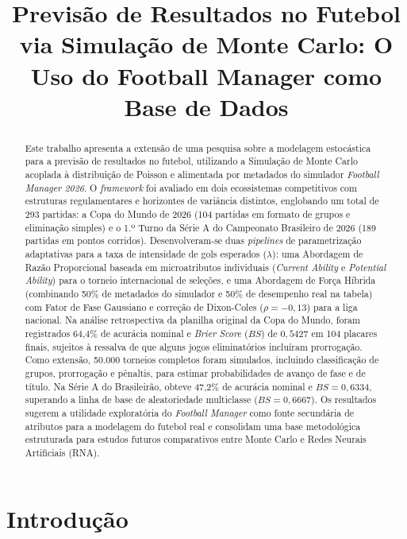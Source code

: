 \documentclass[12pt]{article}
\title{Previsão de Resultados no Futebol via Simulação de Monte Carlo: O Uso do Football Manager como Base de Dados}
\begin{document}
 

\maketitle

\thispagestyle{plain}

\begin{abstract}
	Este trabalho apresenta a extensão de uma pesquisa sobre a modelagem estocástica para a previsão de resultados no futebol, utilizando a Simulação de Monte Carlo acoplada à distribuição de Poisson e alimentada por metadados do simulador \textit{Football Manager 2026}. O \textit{framework} foi avaliado em dois ecossistemas competitivos com estruturas regulamentares e horizontes de variância distintos, englobando um total de 293 partidas: a Copa do Mundo de 2026 (104 partidas em formato de grupos e eliminação simples) e o 1.º Turno da Série A do Campeonato Brasileiro de 2026 (189 partidas em pontos corridos). Desenvolveram-se duas \textit{pipelines} de parametrização adaptativas para a taxa de intensidade de gols esperados ($\lambda$): uma Abordagem de Razão Proporcional baseada em microatributos individuais (\textit{Current Ability} e \textit{Potential Ability}) para o torneio internacional de seleções, e uma Abordagem de Força Híbrida (combinando 50\% de metadados do simulador e 50\% de desempenho real na tabela) com Fator de Fase Gaussiano e correção de Dixon-Coles ($\rho = -0{,}13$) para a liga nacional. Na análise retrospectiva da planilha original da Copa do Mundo, foram registrados 64,4\% de acurácia nominal e \textit{Brier Score} ($BS$) de $0{,}5427$ em 104 placares finais, sujeitos à ressalva de que alguns jogos eliminatórios incluíram prorrogação. Como extensão, 50.000 torneios completos foram simulados, incluindo classificação de grupos, prorrogação e pênaltis, para estimar probabilidades de avanço de fase e de título. Na Série A do Brasileirão, obteve 47,2\% de acurácia nominal e $BS = 0{,}6334$, superando a linha de base de aleatoriedade multiclasse ($BS = 0{,}6667$). Os resultados sugerem a utilidade exploratória do \textit{Football Manager} como fonte secundária de atributos para a modelagem do futebol real e consolidam uma base metodológica estruturada para estudos futuros comparativos entre Monte Carlo e Redes Neurais Artificiais (RNA).
\end{abstract}
     

\section{Introdução}
\end{document}
